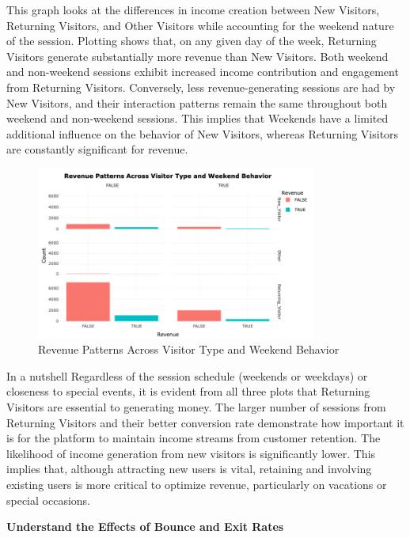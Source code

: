 \documentclass[12pt]{article}
\begin{document}
\FloatBarrier
This graph looks at the differences in income creation between New Visitors, Returning Visitors, and Other Visitors while accounting for the weekend nature of the session. Plotting shows that, on any given day of the week, Returning Visitors generate substantially more revenue than New Visitors. Both weekend and non-weekend sessions exhibit increased income contribution and engagement from Returning Visitors. Conversely, less revenue-generating sessions are had by New Visitors, and their interaction patterns remain the same throughout both weekend and non-weekend sessions. This implies that Weekends have a limited additional influence on the behavior of New Visitors, whereas Returning Visitors are constantly significant for revenue.
\begin{figure}[h]
    \centering
    \includegraphics[width=0.82\textwidth]{Revenue Patterns Across Visitor Type and Weekend Behavior.png}  
    \caption{Revenue Patterns Across Visitor Type and Weekend Behavior}
\end{figure}
\vspace{0.5cm}

In a nutshell Regardless of the session schedule (weekends or weekdays) or closeness to special events, it is evident from all three plots that Returning Visitors are essential to generating money. The larger number of sessions from Returning Visitors and their better conversion rate demonstrate how important it is for the platform to maintain income streams from customer retention. The likelihood of income generation from new visitors is significantly lower. This implies that, although attracting new users is vital, retaining and involving existing users is more critical to optimize revenue, particularly on vacations or special occasions.
\vspace{0.5cm}


\textbf{Understand the Effects of Bounce and Exit Rates}\\
\end{document}
